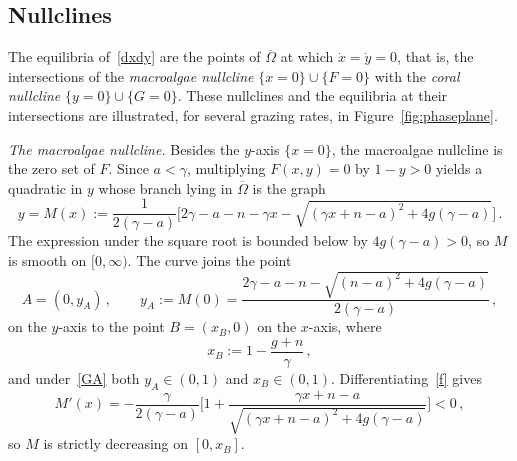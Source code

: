 \documentclass[reqno,11pt]{amsart}
\numberwithin{equation}{section}
\begin{document}
\smallskip
\subsection{Nullclines}\label{subsec:nullclines}

The equilibria of~\eqref{dxdy} are the points of $\overline\Omega$ at which $\dot x=\dot y=0$, that is, the intersections of the {\it macroalgae nullcline} $\{x=0\}\cup\{F=0\}$ with the {\it coral nullcline} $\{y=0\}\cup\{G=0\}$. These nullclines and the equilibria at their intersections are illustrated, for several grazing rates, in Figure~\ref{fig:phaseplane}.


\medskip
\noindent\textit{The macroalgae nullcline.} Besides the $y$-axis $\{x=0\}$, the macroalgae nullcline is the zero set of $F$. Since $a<\gamma$, multiplying $F(x,y)=0$ by $1-y>0$ yields a quadratic in $y$ whose branch lying in $\overline\Omega$ is the graph
\begin{equation}\label{f}
y=M(x):=\frac{1}{2(\gamma-a)}\Big[2\gamma-a-n-\gamma x-\sqrt{(\gamma x+n-a)^2+4g(\gamma-a)}\Big]\,.
\end{equation}
The expression under the square root is bounded below by $4g(\gamma-a)>0$, so $M$ is smooth on $[0,\infty)$. 
The curve joins the point
\begin{equation}\label{yA}
A=(0,y_A)\,,\qquad y_A:=M(0)=\frac{2\gamma-a-n-\sqrt{(n-a)^2+4g(\gamma-a)}}{2(\gamma-a)}\,,
\end{equation}
on the $y$-axis to the point $B=(x_B,0)$ on the $x$-axis, where
\begin{equation}\label{xB}
x_B:=1-\frac{g+n}{\gamma}\,,
\end{equation}
and under~\eqref{GA} both $y_A\in(0,1)$ and $x_B\in(0,1)$. Differentiating~\eqref{f} gives
\begin{equation}\label{fprime}
M'(x)=-\frac{\gamma}{2(\gamma-a)}\Bigg[1+\frac{\gamma x+n-a}{\sqrt{(\gamma x+n-a)^2+4g(\gamma-a)}}\Bigg]<0\,,
\end{equation}
so $M$ is strictly decreasing on $[0,x_B]$.
\end{document}
